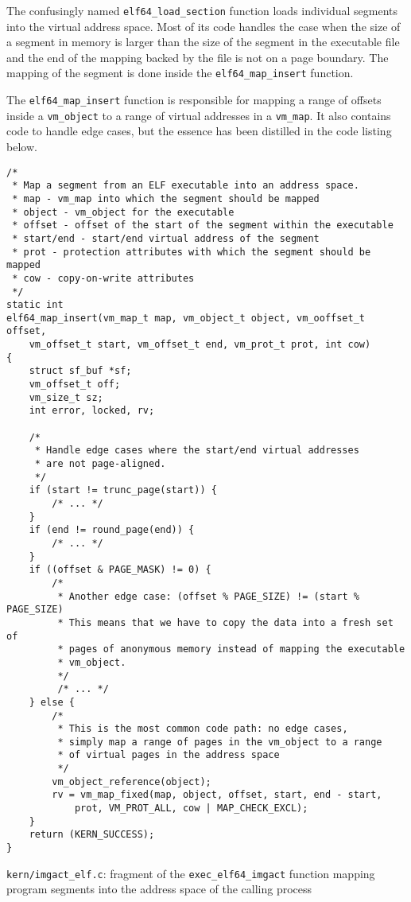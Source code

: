 \documentclass[shortabstract, english]{iithesis}
\begin{document}
The confusingly named \texttt{elf64_load_section} function loads
individual segments into the virtual address space. Most of its code handles the
case when the size of a segment in memory is larger than the size of the segment
in the executable file and the end of the mapping backed by the file is not on a
page boundary. The mapping of the segment is done inside the
\texttt{elf64_map_insert} function.

The \texttt{elf64_map_insert} function is responsible for mapping a range
of offsets inside a \texttt{vm_object} to a range of virtual addresses in
a \texttt{vm_map}. It also contains code to handle edge cases, but the
essence has been distilled in the code listing below.

\begin{listing}[H]
\begin{verbatim}
/*
 * Map a segment from an ELF executable into an address space.
 * map - vm_map into which the segment should be mapped
 * object - vm_object for the executable
 * offset - offset of the start of the segment within the executable
 * start/end - start/end virtual address of the segment
 * prot - protection attributes with which the segment should be mapped
 * cow - copy-on-write attributes
 */
static int
elf64_map_insert(vm_map_t map, vm_object_t object, vm_ooffset_t offset,
    vm_offset_t start, vm_offset_t end, vm_prot_t prot, int cow)
{
    struct sf_buf *sf;
    vm_offset_t off;
    vm_size_t sz;
    int error, locked, rv;

    /*
     * Handle edge cases where the start/end virtual addresses
     * are not page-aligned.
     */
    if (start != trunc_page(start)) {
        /* ... */
    }
    if (end != round_page(end)) {
        /* ... */
    }
    if ((offset & PAGE_MASK) != 0) {
        /*
         * Another edge case: (offset % PAGE_SIZE) != (start % PAGE_SIZE)
         * This means that we have to copy the data into a fresh set of
         * pages of anonymous memory instead of mapping the executable
         * vm_object.
         */
         /* ... */
    } else {
        /*
         * This is the most common code path: no edge cases,
         * simply map a range of pages in the vm_object to a range
         * of virtual pages in the address space
         */
        vm_object_reference(object);
        rv = vm_map_fixed(map, object, offset, start, end - start,
            prot, VM_PROT_ALL, cow | MAP_CHECK_EXCL);
    }
    return (KERN_SUCCESS);
}
\end{verbatim}
  \caption{\texttt{kern/imgact\_elf.c}: fragment of the
    \texttt{exec_elf64_imgact} function mapping program segments into the
    address space of the calling process}
\end{listing}
\end{document}
